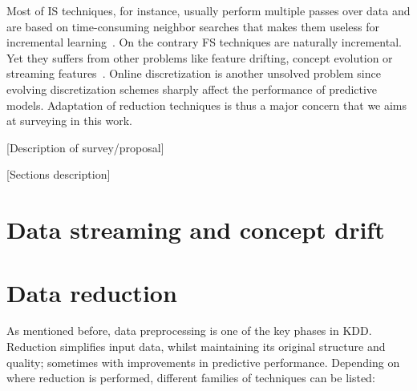 \documentclass[preprint,12pt]{elsarticle}
\begin{document}
Most of IS techniques, for instance, usually perform multiple passes over data and are based on time-consuming neighbor searches that makes them useless for incremental learning~\cite{garcia14}. On the contrary FS techniques are naturally incremental. Yet they suffers from other problems like feature drifting, concept evolution or streaming features~\cite{masud10}. Online discretization is another unsolved problem since evolving discretization schemes sharply affect the performance of predictive models. Adaptation of reduction techniques is thus a major concern that we aims at surveying in this work.

[Description of survey/proposal]

[Sections description]


\section{Data streaming and concept drift}
\label{sec:stream}

\section{Data reduction}
\label{sec:datared}

As mentioned before, data preprocessing is one of the key phases in KDD. Reduction simplifies input data, whilst maintaining its original structure and quality; sometimes with improvements in predictive performance. Depending on where reduction is performed, different families of techniques can be listed:
\end{document}
